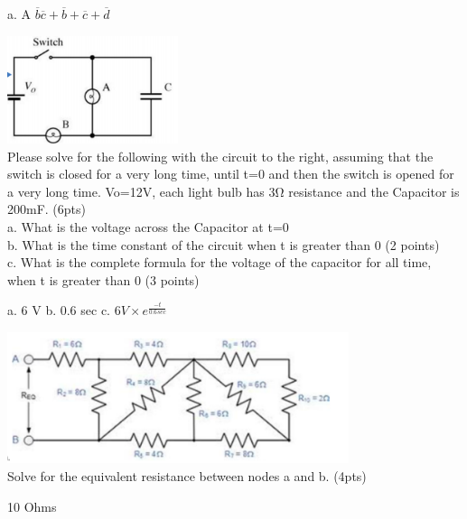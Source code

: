 \documentclass[10pt]{examdesign}
\begin{document}
\begin{shortanswer}[title={Short Answer, 52 pts total},rearrange=no,resetcounter=no]
\begin{question}
        \begin{answer}
        a. A $\overline{b}\overline{c}+\overline{b}+\overline{c}+\overline{d}$
        \end{answer}
        \end{question}
        \begin{question}
        \includegraphics[width=5cm]{circuit5.png}
        \\Please solve for the following with the circuit to the right, assuming that the switch is closed for a very long time, until t=0 and then the switch is opened for a very long time. Vo=12V, each light bulb has 3Ω resistance and the Capacitor is 200mF. (6pts)
        \\a. What is the voltage across the Capacitor at t=0
        \\b. What is the time constant of the circuit when t is greater than 0 (2 points)
        \\c. What is the complete formula for the voltage of the capacitor for all time, when t is greater than 0 (3 points)
        \begin{answer}
        a. 6 V
        b. 0.6 sec
        c. $6 V\times e^\frac{-t}{0.6 sec}$
        \end{answer}
        \end{question}
        \begin{question}
        \includegraphics[width=10cm]{circuit6.png}
        \\Solve for the equivalent resistance between nodes a and b. (4pts)
        \begin{answer}
        10 Ohms
        \end{answer}
        \end{question}
        \begin{question}

\end{question}
\end{shortanswer}
\end{document}
